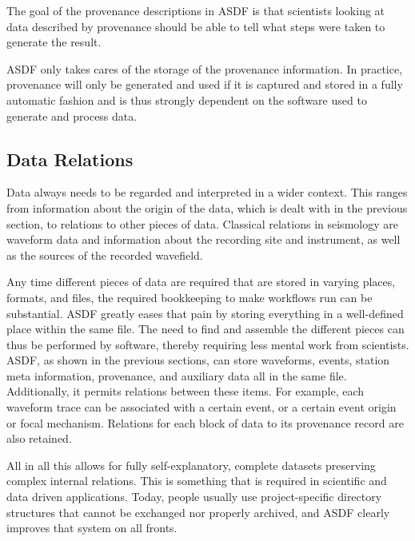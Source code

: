 The goal of the provenance descriptions in ASDF is that scientists looking at
data described by provenance should be able to tell what steps were taken to generate
the result.

ASDF only takes cares of the storage of the provenance information. In
practice, provenance will only be generated and used if it is captured and
stored in a fully automatic fashion and is thus strongly dependent on the
software used to generate and process data.

\subsection{Data Relations}

Data always needs to be regarded and interpreted in a wider context. This
ranges from information about the origin of the data, which is dealt with in
the previous section, to relations to other pieces of data. Classical relations
in seismology are waveform data and information about the recording site and
instrument, as well as the sources of the recorded wavefield.

Any time different pieces of data are required that are stored in varying
places, formats, and files, the required bookkeeping to make workflows run can
be substantial. ASDF greatly eases that pain by storing everything in a
well-defined place within the same file. The need to find and assemble the
different pieces can thus be performed by software, thereby requiring less
mental work from scientists.
ASDF, as shown in the previous sections, can store waveforms, events, station
meta information, provenance, and auxiliary data all in the same file.
Additionally, it permits relations between these items. For example, each
waveform trace can be associated with a certain event, or a certain event
origin or focal mechanism.  Relations for each block of data to its provenance
record are also retained.

All in all this allows for fully self-explanatory, complete datasets preserving
complex internal relations. This is something that is required in
scientific and data driven applications. Today, people usually use project-specific directory structures that cannot be exchanged nor
properly archived, and ASDF clearly improves that system on all fronts.
